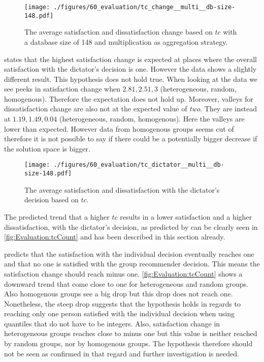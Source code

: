 \begin{figure}
    \centering
    \texttt{[image: ./figures/60\_evaluation/tc\_change\_\_multi\_\_db-size-148.pdf]}
    \caption{The average satisfaction and dissatisfaction change based on $tc$ with a database size of 148 and multiplication as aggregation strategy.}
    \label{fig:Evaluation:tcChange}
\end{figure}

 states that the highest satisfaction change is expected at places where the overall satisfaction with the dictator's decision is one. However the data shows a slightly different result. This hypothesis does not hold true. When looking at the data we see peeks in satisfaction change when $2.81, 2.51, 3$ (heterogeneous, random, homogenous). Therefore the expectation does not hold up. Moreover, valleys for dissatisfaction change are also not at the expected value of \textit{two}. They are instead at $1.19, 1.49, 0.04$ (heterogeneous, random, homogenous). Here the valleys are lower than expected. However data from homogenous groups seems cut of therefore it is not possible to say if there could be a potentially bigger decrease if the solution space is bigger.

\begin{figure}
    \centering
    \texttt{[image: ./figures/60\_evaluation/tc\_dictator\_\_multi\_\_db-size-148.pdf]}
    \caption{The average satisfaction and dissatisfaction with the dictator's decision based on $tc$.}
    \label{fig:Evaluation:tcCount}
\end{figure}

The predicted trend that a higher $tc$ results in a lower satisfaction and a higher dissatisfaction, with the dictator's decision, as predicted by  can be clearly seen in \autoref{fig:Evaluation:tcCount} and has been described in this section already.

 predicts that the satisfaction with the individual decision eventually reaches one and that no one is satisfied with the group recommender decision. This means the satisfaction change should reach minus one. \autoref{fig:Evaluation:tcCount} shows a downward trend that come close to one for heterogeneous and random groups. Also homogenous groups see a big drop but this drop does not reach one. Nonetheless, the steep drop suggests that the hypothesis holds in regards to reaching only one person satisfied with the individual decision when using quantiles that do not have to be integers. Also, satisfaction change in heterogeneous groups reaches close to minus one but this value is neither reached by random groups, nor by homogenous groups. The hypothesis therefore should not be seen as confirmed in that regard and further investigation is needed.

